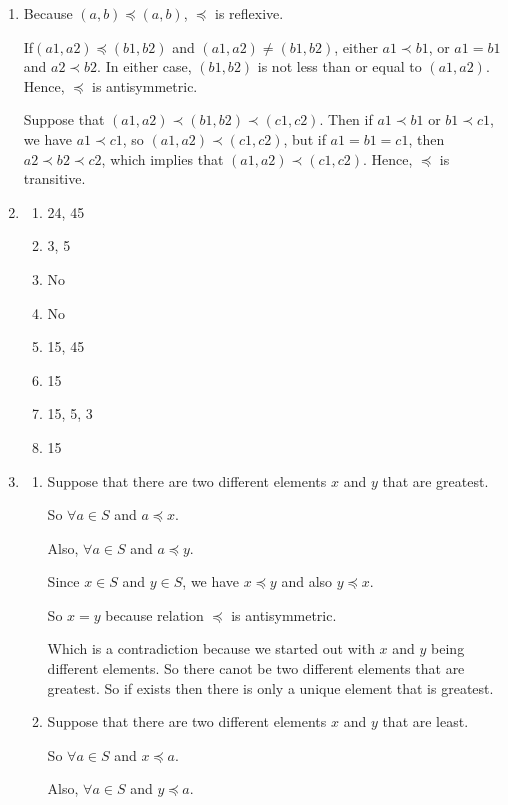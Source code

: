 \documentclass{sig-alternate-05-2015}
\begin{document}
\begin{enumerate}
\item 
Because $(a, b)\preceq (a, b)$, $\preceq$ is reflexive. 

If$(a1, a2)\preceq (b1, b2)$ and $(a1, a2)\neq (b1, b2)$, either $a1\prec b1$, or
$a1 = b1$ and $a2 \prec b2$. In either case, $(b1, b2)$ is not less than or
equal to $(a1, a2)$. Hence, $\preceq$ is antisymmetric. 

Suppose that
$(a1, a2)\prec (b1, b2) \prec (c1, c2)$. Then if $a1\prec b1$ or $b1\prec c1$,
we have $a1 \prec c1$, so $(a1, a2) \prec (c1, c2)$, but if $a1 = b1 = c1$,
then $a2 \prec b2 \prec c2$, which implies that $(a1, a2) \prec (c1, c2)$.
Hence, $\preceq$ is transitive.

\item
\begin{enumerate}
	\item 24, 45 
	\item 3, 5
	\item No
	\item No
	\item 15, 45
	\item 15
	\item 15, 5, 3
	\item 15
\end{enumerate}

\item
	\begin{enumerate}
		\item Suppose that there are two different elements $x$ and $y$ that are greatest.
		
		So $\forall a \in S$ and $a\preceq x$. 
		
		Also, $\forall a \in S$ and $a\preceq y$. 
		
		Since $x \in S$ and $y\in S$, we have $x\preceq y$ and also $y \preceq x$. 
		
		So $x=y$ because relation $\preceq$ is antisymmetric.
		
		Which is a contradiction because we started out with $x$ and $y$ being different
		elements. So there canot be two different elements that are greatest. So if
		exists then there is only a unique element that is greatest.

		\item Suppose that there are two different elements $x$ and $y$ that are least.
		
		So $\forall a \in S$ and $x\preceq a$. 
		
		Also, $\forall a \in S$ and $y\preceq a$. 
		

\end{enumerate}
\end{enumerate}
\end{document}
